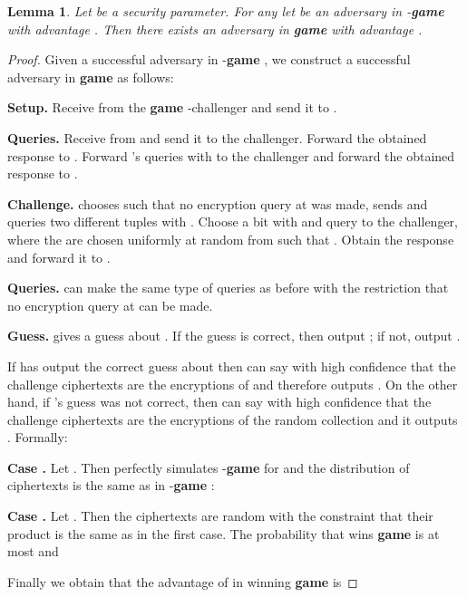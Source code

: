 \documentclass[10pt]{extarticle}
\newtheorem{Lem}[Thm]{Lemma}
\begin{document}
\begin{Lem}\label{gamePoneone} Let  be a security parameter. For any  let  be an adversary in -\textbf{\upshape game } with advantage . Then there exists an adversary  in \textbf{\upshape game } with advantage .
\end{Lem}
\begin{proof} Given a successful adversary  in -\textbf{game} , we construct a successful adversary  in \textbf{game}  as follows:
\noindent\begin{description}
 \item\textbf{Setup.} Receive  from the \textbf{game} -challenger and send it to .
\item\textbf{Queries.} Receive  from  and send it to the challenger. Forward the obtained response  to . Forward 's queries  with  to the challenger and forward the obtained response  to .
\item\textbf{Challenge.}  chooses  such that no encryption query at  was made, sends  and queries two different tuples  with . Choose a bit  with  and query  to the challenger, where the  are chosen uniformly at random from  such that . Obtain the response  and forward it to . 
\item\textbf{Queries.}  can make the same type of queries as before with the restriction that no encryption query at  can be made.
\item\textbf{Guess.}  gives a guess about . If the guess is correct, then output ; if not, output .
\end{description}
If  has output the correct guess about  then  can say with high confidence that the challenge ciphertexts are the encryptions of  and therefore outputs . On the other hand, if 's guess was not correct, then  can say with high confidence that the challenge ciphertexts are the encryptions of the random collection  and it outputs . Formally:\par\medskip

\noindent\textbf{Case .} Let . Then  perfectly simulates -\textbf{game}  for  and the distribution of ciphertexts is the same as in -\textbf{game} :
\par\medskip

\noindent\textbf{Case .} Let . Then the ciphertexts are random with the constraint 
that their product is the same as in the first case. The probability that  wins \textbf{game}  is at most  and

Finally we obtain that the advantage of  in winning \textbf{game}  is

\end{proof}
\end{document}
